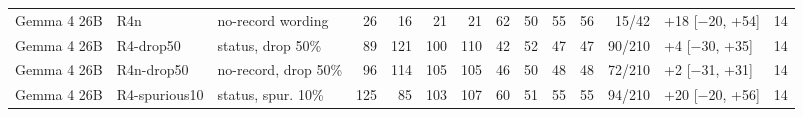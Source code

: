 \begin{table}[t]
{\begin{tabular}{lllrrrrrrrrrll}
Gemma 4 26B & R4n & no-record wording & 26 & 16 & 21 & 21 & 62 & 50 & 55 & 56 & 15/42 & +18 [$-$20, +54] & 14 \\
Gemma 4 26B & R4-drop50 & status, drop 50\% & 89 & 121 & 100 & 110 & 42 & 52 & 47 & 47 & 90/210 & +4 [$-$30, +35] & 14 \\
Gemma 4 26B & R4n-drop50 & no-record, drop 50\% & 96 & 114 & 105 & 105 & 46 & 50 & 48 & 48 & 72/210 & +2 [$-$31, +31] & 14 \\
Gemma 4 26B & R4-spurious10 & status, spur. 10\% & 125 & 85 & 103 & 107 & 60 & 51 & 55 & 55 & 94/210 & +20 [$-$20, +56] & 14 \\
\bottomrule
\end{tabular}}
\end{table}
